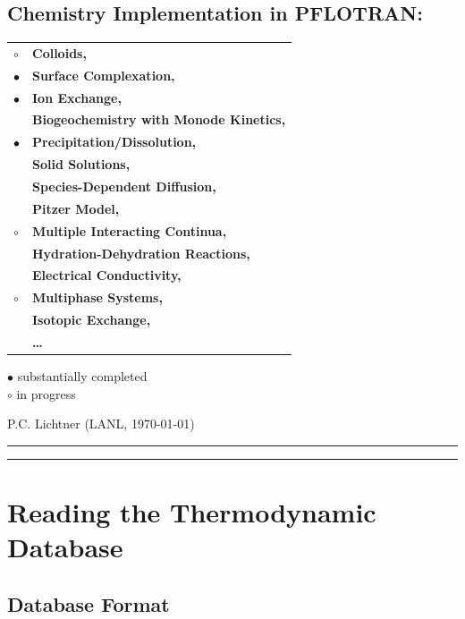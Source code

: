 \documentclass[12pt]{article}
\newcommand{\bcr}{\begin{center}}
\newcommand{\ecr}{\end{center}}
\newcommand{\longline}{\noindent\rule[-0.1in]{\textwidth}{0.01in}}
\begin{document}
\bcr

\section*{Chemistry Implementation in PFLOTRAN:}
\begin{tabular}{ll}
$\circ$ & \bf\large Colloids,\\ 
$\bullet$ & \bf\large Surface Complexation, \\
$\bullet$ & \bf\large Ion Exchange, \\
& \bf\large Biogeochemistry with Monode Kinetics, \\
$\bullet$ & \bf\large Precipitation/Dissolution, \\
& \bf\large Solid Solutions, \\
& \bf\large Species-Dependent Diffusion, \\
& \bf\large Pitzer Model, \\
$\circ$ & \bf\large Multiple Interacting Continua, \\
&\bf\large Hydration-Dehydration Reactions, \\
&\bf\large Electrical Conductivity, \\
$\circ$ & \bf\large Multiphase Systems, \\
&\bf\large Isotopic Exchange, \\
&\bf\large \ldots
\end{tabular}

\hfill $\bullet$ substantially completed\\
\hfill $\circ$ in progress

P.C. Lichtner (LANL, \today)

\ecr

\longline

\tableofcontents

\longline

\section{Reading the Thermodynamic Database}

\setcounter{equation}{0}

\subsection{Database Format}
\end{document}
